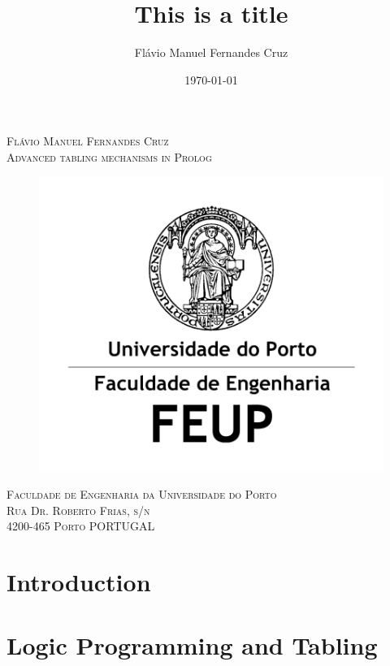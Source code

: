 \documentclass[11pt]{report}
\title{\fontsize{20}{30}\bfseries This is a title}
\author{Flávio Manuel Fernandes Cruz \\}
\date{\today}
\begin{document}
  
\begin{titlepage}

\begin{center}
  
\textsc{\large Flávio Manuel Fernandes Cruz}\\[1.5cm]

\textsc{\LARGE Advanced tabling mechanisms in Prolog}
\begin{figure}[ht]
  \centering
  \includegraphics[scale=1.0]{feup.pdf}
\end{figure}


\textsc{\large Faculdade de Engenharia da Universidade do Porto\\ \small Rua Dr. Roberto Frias, s/n \\ 4200-465 Porto PORTUGAL}\\[1.5cm]
  
\end{center}
\end{titlepage}

\tableofcontents
\listoffigures
\listoftables
\listofalgorithms
\clearpage

\chapter{Introduction}


\chapter{Logic Programming and Tabling}

\end{document}
